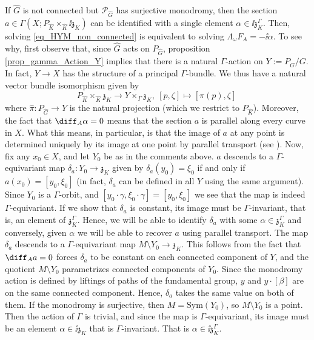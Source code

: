 \begin{obs} \label{obs_HK_non_connected_alpha_a}
   If \(\hat{G}\) is not connected but \(\mathcal{P}_{\hat{G}}\) has  surjective monodromy, then the section \(a\in \Gamma(X;P_{\hat{K}}\times _{\hat{K}} \ii \mathfrak{z}_K)\) can be identified with a single element \(\alpha\in \ii \mathfrak{z}_K^\Gamma\). Then, solving \eqref{eq_HYM_non_connected} is equivalent to solving \(\Lambda_\omega F_A=-\ii \alpha\). To see why, first observe that, since \(\hat{G}\) acts on \(P_{\hat{G}}\), proposition \ref{prop_gamma_Action_Y} implies that there is a natural \(\Gamma\)-action on \(Y:=P_{\hat{G}}/G\). In fact, \(Y \to X\) has the structure of a principal \(\Gamma\)-bundle. We thus have a natural vector bundle isomorphism given by 
    \[
        P_{\hat{K}} \times_{\hat{K}} \mathfrak{z}_K \longrightarrow Y \times_\Gamma \mathfrak{z}_K, \ [p, \zeta] \mapsto [\hat{\pi}(p), \zeta] \
    \]
    where \(\hat{\pi}\colon P_{\hat{G}}\to Y\) is the natural projection (which we restrict to \(P_{\hat{K}}\)). Moreover, the fact that \(\diff_A \alpha=0\) means that the section \(a\) is parallel along every curve in \(X\). What this means, in particular, is that the image of \(a\) at any point is determined uniquely by its image at one point by parallel transport (see \parencite[Prop. 7.6]{lee_introCM}). Now, fix any \(x_0\in X\), and let \(Y_0\) be as in the comments above. \(a\) descends to a \(\Gamma\)-equivariant map \(\delta_a \colon Y_0 \to \mathfrak{z}_K\) given by \(\delta_a(y_0)=\xi_0\) if and only if \(a(x_0)=[y_0, \xi_0]\) (in fact, \(\delta_a\) can be defined in all \(Y\) using the same argument). Since \(Y_0\) is a \(\Gamma\)-orbit, and \([y_0\cdot \gamma, \xi_0\cdot \gamma]=[y_0, \xi_0]\) we see that the map is indeed \(\Gamma\)-equivariant. If we show that \(\delta_a\) is constant, its image must be \(\Gamma\)-invariant, that is, an element of \(\mathfrak{z}_K^\Gamma\). Hence, we will be able to identify \(\delta_a\) with some \(\alpha\in \mathfrak{z}_K^\Gamma\) and conversely, given \(\alpha\) we will be able to recover \(a\) using parallel transport. The map \(\delta_a\) descends to a \(\Gamma\)-equivariant map \(M\setminus Y_0\to \mathfrak{z}_K\). This follows from the fact that \(\diff_A a=0\) forces \(\delta_a\) to be constant on each connected component of \(Y\), and the quotient \(M \setminus Y_0\) parametrizes connected components of \(Y_0\). Since the monodromy action is defined by liftings of paths of the fundamental group, \(y\) and \(y\cdot [\beta]\) are on the same connected component. Hence, \(\delta_a\) takes the same value on both of them. If the monodromy is surjective, then \(M=\mathrm{Sym}(Y_0)\), so \(M\setminus Y_0\) is a point. Then the action of \(\Gamma\) is trivial, and since the map is \(\Gamma\)-equivariant, its image must be an element \(\alpha \in \ii \mathfrak{z}_K\) that is \(\Gamma\)-invariant. That is \(\alpha \in \ii \mathfrak{z}_K^\Gamma\).
    

\end{obs}
